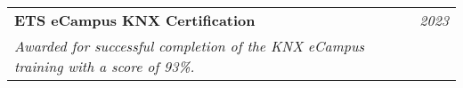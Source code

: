 \documentclass[letterpaper,11pt]{article}
\makeatletter
\newcommand{\resumeOrganizationHeading}[4]{
  \vspace{-2pt}\item
    \begin{tabular*}{0.97\textwidth}[t]{l@{\extracolsep{\fill}}r}
      \textbf{#1} & \textit{\small #2} \\
      \textit{\small#3}
    \end{tabular*}\vspace{-7pt}
}
\newcommand{\resumeSubHeadingListStart}{\begin{itemize}[leftmargin=0.15in, label={}]}
\newcommand{\resumeSubHeadingListEnd}{\end{itemize}}
\makeatother
\begin{document}
    	\resumeOrganizationHeading
    	{ETS eCampus KNX Certification}{2023}{Awarded for successful completion of the KNX eCampus training with a score of 93\%.}
    
   \resumeSubHeadingListEnd




    
    











\end{document}
